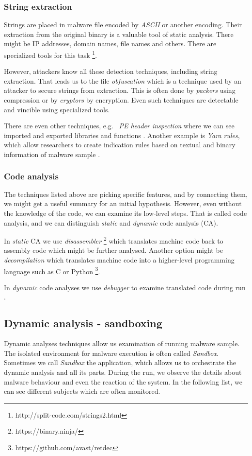 \subsubsection*{String extraction}
Strings are placed in malware file encoded by \emph{ASCII} or another encoding. Their extraction from the original binary is a valuable tool of static analysis. There might be IP addresses, domain names, file names and others. There are specialized tools for this task \footnote{http://split-code.com/strings2.html}. 

However, attackers know all these detection techniques, including string extraction. That leads us to the file \emph{obfuscation} which is a technique used by an attacker to secure strings from extraction. This is often done by \emph{packers} using compression or by \emph{cryptors} by encryption. Even such techniques are detectable and vincible using specialized tools.

There are even other techniques, e.g. \ \emph{PE header inspection} where we can see imported and exported libraries and functions \cite{Sikorski2012}. Another example is \emph{Yara rules}, which allow researchers to create indication rules based on textual and binary information of malware sample \cite{KA2018}.

\subsubsection*{Code analysis}
The techniques listed above are picking specific features, and by connecting them, we might get a useful summary for an initial hypothesis. 
However, even without the knowledge of the code, we can examine its low-level steps. That is called code analysis, and we can distinguish \emph{static} and \emph{dynamic} code analysis (CA).

In \emph{static} CA we use \emph{disassembler} \footnote{https://binary.ninja/} which translates machine code back to assembly code which might be further analysed. Another option might be \emph{decompilation} which translates machine code into a higher-level programming language such as C or Python \footnote{https://github.com/avast/retdec}.

In \emph{dynamic} code analyses we use \emph{debugger} to examine translated code during run \cite{KA2018}.

\subsection{Dynamic analysis - sandboxing}
Dynamic analyses techniques allow us examination of running malware sample. The isolated environment for malware execution is often called \emph{Sandbox}. Sometimes we call \emph{Sandbox} the application, which allows us to orchestrate the dynamic analysis and all its parts. During the run, we observe the details about malware behaviour and even the reaction of the system. In the following list, we can see different subjects which are often monitored.

